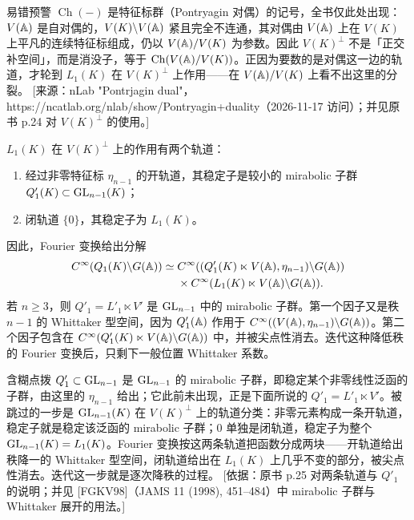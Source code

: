 \begin{transnote}{易错预警}
$\operatorname{Ch}(-)$ 是特征标群（Pontryagin 对偶）的记号，全书仅此处出现：$V(\mathbb{A})$ 是自对偶的，$V(K)\backslash V(\mathbb{A})$ 紧且完全不连通，其对偶由 $V(\mathbb{A})$ 上在 $V(K)$ 上平凡的连续特征标组成，仍以 $V(\mathbb{A})/V(K)$ 为参数。因此 $V(K)^\perp$ 不是「正交补空间」，而是消没子，等于 $\operatorname{Ch}(V(\mathbb{A})/V(K))$。正因为要数的是对偶这一边的轨道，才轮到 $L_1(K)$ 在 $V(K)^\perp$ 上作用——在 $V(\mathbb{A})/V(K)$ 上看不出这里的分裂。
[来源：nLab "Pontrjagin dual"，https://ncatlab.org/nlab/show/Pontryagin+duality（2026-11-17 访问）；并见原书 p.24 对 $V(K)^\perp$ 的使用。]
\end{transnote}
$L_1(K)$ 在 $V(K)^\perp$ 上的作用有两个轨道：
\begin{enumerate}
\item 经过非零特征标 $\eta_{n-1}$ 的开轨道，其稳定子是较小的 mirabolic 子群 $Q'_1(K)\subset\operatorname{GL}_{n-1}(K)$；
\item 闭轨道 $\{0\}$，其稳定子为 $L_1(K)$。
\end{enumerate}
因此，Fourier 变换给出分解
\[
\begin{aligned}
C^\infty(Q_1(K)\backslash G(\mathbb{A}))\simeq{}&C^\infty((Q'_1(K)\ltimes V(\mathbb{A}),\eta_{n-1})\backslash G(\mathbb{A}))\\
&\times C^\infty(L_1(K)\ltimes V(\mathbb{A})\backslash G(\mathbb{A})).
\end{aligned}
\]
若 $n\ge3$，则 $Q'_1=L'_1\ltimes V'$ 是 $\operatorname{GL}_{n-1}$ 中的 mirabolic 子群。第一个因子又是秩 $n-1$ 的 Whittaker 型空间，因为 $Q'_1(\mathbb{A})$ 作用于 $C^\infty((V(\mathbb{A}),\eta_{n-1})\backslash G(\mathbb{A}))$。第二个因子包含在 $C^\infty(Q'_1(K)\ltimes V(\mathbb{A})\backslash G(\mathbb{A}))$ 中，并被尖点性消去。迭代这种降低秩的 Fourier 变换后，只剩下一般位置 Whittaker 系数。

\begin{transnote}{含糊点拨}
$Q'_1\subset\operatorname{GL}_{n-1}$ 是 $\operatorname{GL}_{n-1}$ 的 mirabolic 子群，即稳定某个非零线性泛函的子群，由这里的 $\eta_{n-1}$ 给出；它此前未出现，正是下面所说的 $Q'_1=L'_1\ltimes V'$。被跳过的一步是 $\operatorname{GL}_{n-1}(K)$ 在 $V(K)^\perp$ 上的轨道分类：非零元素构成一条开轨道，稳定子就是稳定该泛函的 mirabolic 子群；$0$ 单独是闭轨道，稳定子为整个 $\operatorname{GL}_{n-1}(K)=L_1(K)$。Fourier 变换按这两条轨道把函数分成两块——开轨道给出秩降一的 Whittaker 型空间，闭轨道给出在 $L_1(K)$ 上几乎不变的部分，被尖点性消去。迭代这一步就是逐次降秩的过程。
[依据：原书 p.25 对两条轨道与 $Q'_1$ 的说明；并见 [FGKV98]（JAMS 11 (1998), 451–484）中 mirabolic 子群与 Whittaker 展开的用法。]
\end{transnote}

